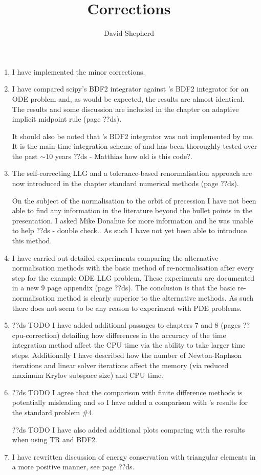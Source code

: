 \documentclass[12pt,a4paper,pdftex]{article}
\title{Corrections}
\author{David Shepherd}
\begin{document}
\maketitle

\begin{enumerate}
\item I have implemented the minor corrections.

\item I have compared scipy's \VODE BDF2 integrator against \oomph's BDF2 integrator for an ODE problem and, as would be expected, the results are almost identical. The results and some discussion are included in the chapter on adaptive implicit midpoint rule (page ??ds).

It should also be noted that \oomph's BDF2 integrator was not implemented by me.
It is the main time integration scheme of \oomph and has been thoroughly tested over the past $\sim 10$ years ??ds - Matthias how old is this code?.

\item The self-correcting LLG and a tolerance-based renormalisation approach are now introduced in the chapter standard numerical methods (page ??ds).

  On the subject of the normalisation to the orbit of precession I have not been able to find any information in the literature beyond the bullet points in the presentation.
I asked Mike Donahue for more information and he was unable to help ??ds - double check..
As such I have not yet been able to introduce this method.

\item I have carried out detailed experiments comparing the alternative normalisation methods with the basic method of re-normalisation after every step for the example ODE LLG problem.
These experiments are documented in a new 9 page appendix (page ??ds).
The conclusion is that the basic re-normalisation method is clearly superior to the alternative methods.
As such there does not seem to be any reason to experiment with PDE problems.

\item ??ds TODO
  I have added additional passages to chapters 7 and 8 (pages ??cpu-correction) detailing how differences in the accuracy of the time integration method affect the CPU time via the ability to take larger time steps.
  Additionally I have described how the number of Newton-Raphson iterations and linear solver iterations affect the memory (via reduced maximum Krylov subspace size) and CPU time.

\item ??ds TODO
I agree that the comparison with finite difference methods is potentially misleading and so I have added a comparison with \nmag's results for the \mumag standard problem \#4.

??ds TODO
I have also added additional plots comparing with the results when using TR and BDF2.

\item I have rewritten discussion of energy conservation with triangular elements in a more positive manner, see page ??ds.

\end{enumerate}
\end{document}
